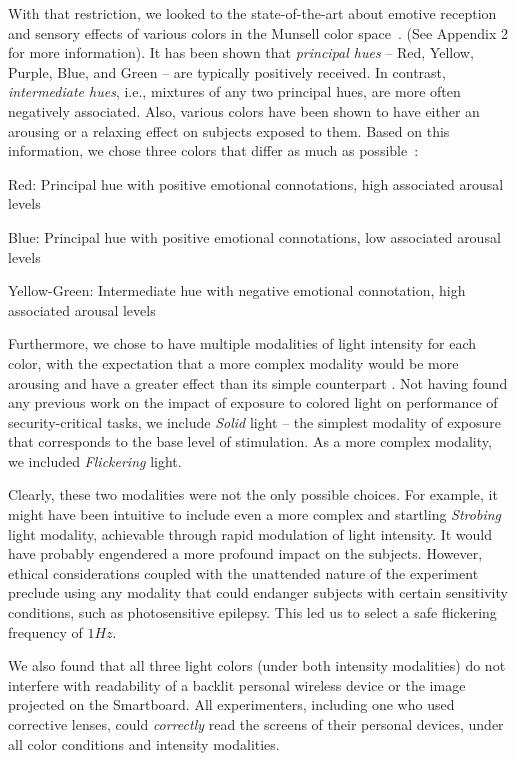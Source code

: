 \documentclass{llncs}
\begin{document}
With that restriction, we looked to the state-of-the-art about emotive reception and sensory 
effects of various colors in the Munsell color space~\cite{1940history}.  
(See Appendix 2 for more information).
It has been shown that \emph{principal hues} -- Red, Yellow, Purple, Blue, and Green
-- are typically positively received. In contrast, \emph{intermediate hues}, i.e., mixtures of 
any two principal hues, are more often negatively associated. Also, various colors have been 
shown to have either an arousing or a relaxing effect on subjects exposed to them. 
Based on this information, we chose three colors that differ as much as possible~\cite{1}: 
%
\begin{compactitem}
  \item Red: Principal hue with positive emotional connotations, high associated arousal levels
  \item Blue: Principal hue with positive emotional connotations, low associated arousal levels 
  \item Yellow-Green: Intermediate hue with negative emotional connotation,
  high associated arousal levels
\end{compactitem}
%
Furthermore, we chose to have multiple modalities of light intensity for each color, 
with the expectation that a more complex modality would be more arousing and have a
greater effect than its simple counterpart \cite{koelega1990dynamic}. 
Not having found any previous work on the 
impact of exposure to colored light on performance of security-critical tasks, we include
{\em Solid} light -- the simplest modality of exposure that corresponds  to the base level of 
stimulation. As a more complex modality, we included {\em Flickering}  light. 

Clearly, these two modalities were not the only possible choices. For example, it might have been
intuitive to include even a more complex and startling {\em Strobing} light modality, achievable
through rapid modulation of light intensity. It would have probably engendered a more profound
impact on the subjects. However, ethical considerations coupled with the unattended nature of the
experiment preclude using any modality that could endanger subjects with certain sensitivity 
conditions, such as photosensitive epilepsy. This led us to select a safe flickering frequency of $1 Hz$.

We also found that all three light colors (under both intensity modalities) do not interfere with 
readability of a backlit personal wireless device or the image projected on the Smartboard. 
All experimenters, including one who used corrective lenses, could {\em correctly} read the
screens of their personal devices, under all color conditions and intensity modalities. 
\end{document}
